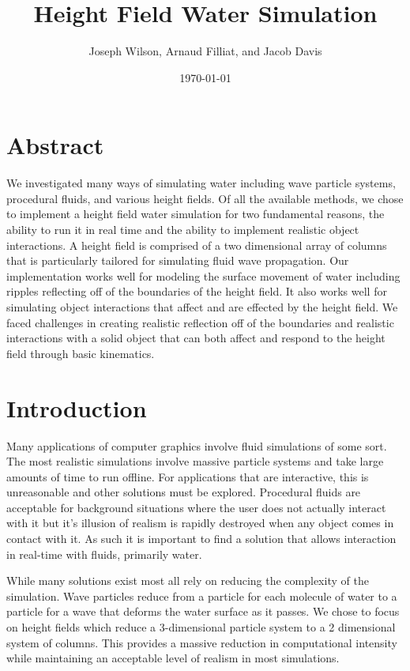 \documentclass[12pt,notitlepage]{article}
\title{Height Field Water Simulation}
\author{Joseph Wilson, Arnaud Filliat, and Jacob Davis}
\date{\today}
\begin{document}
\maketitle

\section{Abstract}

We investigated many ways of simulating water including wave particle systems, 
procedural fluids, and various height fields. Of all the available methods, we 
chose to implement a height field water simulation for two fundamental reasons, 
the ability to run it in real time and the ability to implement realistic 
object interactions. A height field is comprised of a two dimensional array of 
columns that is particularly tailored for simulating fluid wave propagation. 
Our implementation works well for modeling the surface movement of water 
including ripples reflecting off of the boundaries of the height field. It also 
works well for simulating object interactions that affect and are effected by 
the height field. We faced challenges in creating realistic reflection off of 
the boundaries and realistic interactions with a solid object that can both 
affect and respond to the height field through basic kinematics.

\section{Introduction}

Many applications of computer graphics involve fluid simulations of some sort.  The most realistic simulations involve massive particle systems and take large amounts of time to run offline.  For applications that are interactive, this is unreasonable and other solutions must be explored.  Procedural fluids are acceptable for background situations where the user does not actually interact with it but it’s illusion of realism is rapidly destroyed when any object comes in contact with it.  As such it is important to find a solution that allows interaction in real-time with fluids, primarily water.

While many solutions exist most all rely on reducing the complexity of the 
simulation.  Wave particles reduce from a particle for each molecule of water 
to a particle for a wave that deforms the water surface as it passes.  We chose 
to focus on height fields which reduce a 3-dimensional particle system to a 2 
dimensional system of columns.  This provides a massive reduction in 
computational intensity while maintaining an acceptable level of realism in 
most simulations.
\end{document}
